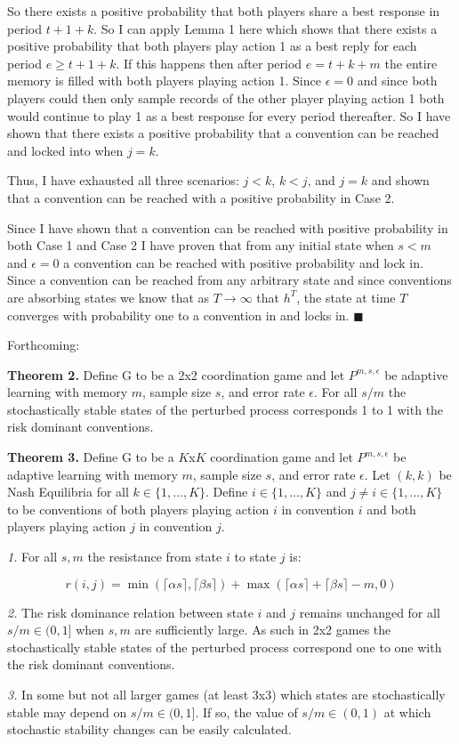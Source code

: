 \documentclass{article}
\begin{document}
\vskip6pt

So there exists a positive probability that both players share a best response in period $t+1+k$. So I can apply Lemma 1 here which shows that there exists a positive probability that both players play action 1 as a best reply for each period $e \geq t+1+k$. If this happens then after period $e=t+k+m$ the entire memory is filled with both players playing action 1. Since $\epsilon=0$ and since both players could then only sample records of the other player playing action 1 both would continue to play 1 as a best response for every period thereafter. So I have shown that there exists a positive probability that a convention can be reached and locked into when $j=k$. 

\vskip12pt

Thus, I have exhausted all three scenarios: $j<k$, $k<j$, and $j=k$ and shown that a convention can be reached with a positive probability in Case 2.

\vskip18pt

Since I have shown that a convention can be reached with positive probability in both Case 1 and Case 2 I have proven that from any initial state when $s<m$ and $\epsilon=0$ a convention can be reached with positive probability and lock in. Since a convention can be reached from any arbitrary state and since conventions are absorbing states we know that as $T \rightarrow \infty$ that $h^T$, the state at time $T$ converges with probability one to a convention in and locks in. $\blacksquare$

\pagebreak

Forthcoming:

\textbf{Theorem 2.} Define G to be a 2x2 coordination game and let $P^{m,s,\epsilon}$ be adaptive learning with memory $m$, sample size $s$, and error rate $\epsilon$. For all $s/m$ the stochastically stable states of the perturbed process corresponds 1 to 1 with the risk dominant conventions.

\vskip12pt

\textbf{Theorem 3.} Define G to be a $K$x$K$ coordination game and let $P^{m,s,\epsilon}$ be adaptive learning with memory $m$, sample size $s$, and error rate $\epsilon$. Let $(k,k)$ be Nash Equilibria for all $k \in \{1,...,K\}$. Define $i \in \{1,...,K\}$ and $j \neq i \in \{1,...,K\}$ to be conventions of both players playing action $i$ in convention $i$ and both players playing action $j$ in convention $j$.

\textit{1.} For all $s, m$ the resistance from state $i$ to state $j$ is:

$$r(i,j)=\min(\lceil \alpha s \rceil,\lceil \beta s \rceil)+\max(\lceil \alpha s \rceil+\lceil \beta s \rceil-m,0)$$

\textit{2.} The risk dominance relation between state $i$ and $j$ remains unchanged for all $s/m \in (0,1]$ when $s,m$ are sufficiently large. As such in 2x2 games the stochastically stable states of the perturbed process correspond one to one with the risk dominant conventions.

\textit{3.} In some but not all larger games (at least 3x3) which states are stochastically stable may depend on $s/m \in (0,1]$. If so, the value of $s/m \in (0,1)$ at which stochastic stability changes can be easily calculated.
\end{document}
